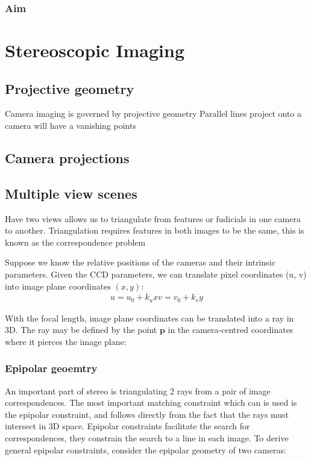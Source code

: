 \subsubsection{Aim}



\section{Stereoscopic Imaging}

\subsection{Projective geometry}

Camera imaging is governed by projective geometry
Parallel lines project onto a camera will have a vanishing points

\subsection{Camera projections}

\subsection{Multiple view scenes}
Have two views allows us to triangulate from features or fudicials in one camera to another.
Triangulation requires features in both images to be the same, this is known as the correspondence problem

Suppose we know the relative positions of the cameras and their intrinsic parameters.
Given the CCD parameters, we can translate pixel coordinates (u, v) into image plane coordinates $(x, y)$:
\begin{align}
    u = u_0 + k_u x
    v = v_0 + k_v y
\end{align}

With the focal length, image plane coordinates can be translated into a ray in 3D.
The ray may be defined by the point $\textbf{p}$ in the camera-centred coordinates where it pierces the image plane:

\subsubsection{Epipolar geoemtry}
An important part of stereo is triangulating 2 rays from a pair of image correspondences.
The most important matching constraint which can is used is the epipolar constraint, and follows directly from the fact that the rays must intersect in 3D space.
Epipolar constraints facilitate the search for correspondences, they constrain the search to a line in each image.
To derive general epipolar constraints, consider the epipolar geometry of two cameras:

